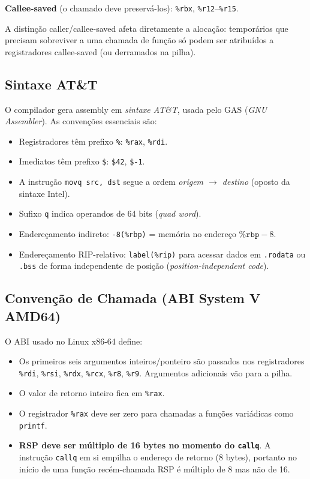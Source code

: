 \medskip
\noindent
\textbf{Callee-saved} (o chamado deve preservá-los):
\texttt{\%rbx}, \texttt{\%r12}–\texttt{\%r15}.

A distinção caller/callee-saved afeta diretamente a alocação: temporários
que precisam sobreviver a uma chamada de função só podem ser atribuídos a
registradores callee-saved (ou derramados na pilha).

\subsection{Sintaxe AT\&T}

O compilador gera assembly em \emph{sintaxe AT\&T}, usada pelo GAS
(\textit{GNU Assembler}). As convenções essenciais são:

\begin{itemize}
  \item Registradores têm prefixo \texttt{\%}: \texttt{\%rax}, \texttt{\%rdi}.
  \item Imediatos têm prefixo \texttt{\$}: \texttt{\$42}, \texttt{\$-1}.
  \item A instrução \texttt{movq src, dst} segue a ordem
    \emph{origem $\to$ destino} (oposto da sintaxe Intel).
  \item Sufixo \texttt{q} indica operandos de 64 bits (\textit{quad word}).
  \item Endereçamento indireto: \texttt{-8(\%rbp)} = memória no endereço
    $\texttt{\%rbp} - 8$.
  \item Endereçamento RIP-relativo: \texttt{label(\%rip)} para acessar
    dados em \texttt{.rodata} ou \texttt{.bss} de forma independente de
    posição (\textit{position-independent code}).
\end{itemize}

\subsection{Convenção de Chamada (ABI System V AMD64)}

O ABI usado no Linux x86-64 define:

\begin{itemize}
  \item Os primeiros seis argumentos inteiros/ponteiro são passados nos
    registradores \texttt{\%rdi}, \texttt{\%rsi}, \texttt{\%rdx},
    \texttt{\%rcx}, \texttt{\%r8}, \texttt{\%r9}. Argumentos adicionais
    vão para a pilha.
  \item O valor de retorno inteiro fica em \texttt{\%rax}.
  \item O registrador \texttt{\%rax} deve ser zero para chamadas a funções
    variádicas como \texttt{printf}.
  \item \textbf{RSP deve ser múltiplo de 16 bytes no momento do
    \texttt{callq}}. A instrução \texttt{callq} em si empilha o endereço de
    retorno (8 bytes), portanto no início de uma função recém-chamada RSP é
    múltiplo de 8 mas não de 16.
\end{itemize}

